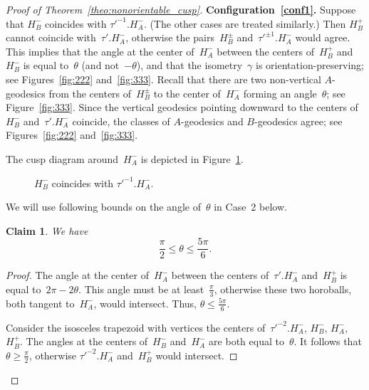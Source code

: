 \documentclass[11pt,reqno]{amsart}
\newtheorem{claim}[theorem]{Claim}
\theoremstyle{definition}
\numberwithin{equation}{section}
\numberwithin{equation}{section}
\begin{document}
\begin{proof}[Proof of Theorem~\ref{theo:nonorientable_cusp}]
\medskip



\textbf{Configuration~\eqref{conf1}.}
Suppose that $H_B^-$ coincides with $\tau'^{-1}.H_A^-$.
(The other cases are treated similarly.)
Then $H_B^+$ cannot coincide with~$\tau'.H_A^-$, otherwise the pairs~$H_B^{\pm}$ and~$\tau'^{\pm 1}.H_A^-$ would agree.
This implies that the angle at the center of~$H_A^-$ between the centers of~$H_B^+$ and~$H_B^-$ is equal to~$\theta$ (and not~$-\theta$), and that the isometry~$\gamma$ is orientation-preserving; see Figures~\ref{fig:222} and~\ref{fig:333}.
Recall that there are two non-vertical $A$-geodesics from the centers of~$H_B^\pm$ to the center of~$H_A^-$ forming an angle~$\theta$; see Figure~\ref{fig:333}.
Since the vertical geodesics pointing downward to the centers of~$H_B^-$ and~$\tau'.H_A^-$ coincide, the classes of $A$-geodesics and $B$-geodesics agree; see Figures~\ref{fig:222} and~\ref{fig:333}.

The cusp diagram around~$H_A^-$ is depicted in Figure~\ref{fig:444}.


\medskip

\begin{figure}[htbp!]
\centering
\vspace*{2.4cm}
\hspace*{-0.5cm}
\def\svgwidth{0.3\textheight}

\vspace*{0.4cm}
\caption{$H_B^-$ coincides with $\tau'^{-1}.H_A^-$.} \label{fig:444}
\end{figure}


We will use following bounds on the angle of~$\theta$ in Case~2 below.

\begin{claim}
We have 
\[
\frac{\pi}{2} \leq \theta \leq \frac{5 \pi}{6}.
\]
\end{claim}

\begin{proof}
The angle at the center of~$H_A^-$ between the centers of~$\tau'.H_A^-$ and~$H_B^+$ is equal to~$2\pi-2\theta$.
This angle must be at least~$\frac{\pi}{3}$, otherwise these two horoballs, both tangent to~$H_A^-$, would intersect.
Thus, $\theta \leq \frac{5 \pi}{6}$.

Consider the isosceles trapezoid with vertices the centers of~$\tau'^{-2}.H_A^-$, $H_B^-$, $H_A^-$, $H_B^+$.
The angles at the centers of~$H_B^-$ and~$H_A^-$ are both equal to~$\theta$.
It follows that $\theta \geq \frac{\pi}{2}$, otherwise $\tau'^{-2}.H_A^-$ and~$H_B^+$ would intersect.
\end{proof}



\end{proof}
\end{document}
